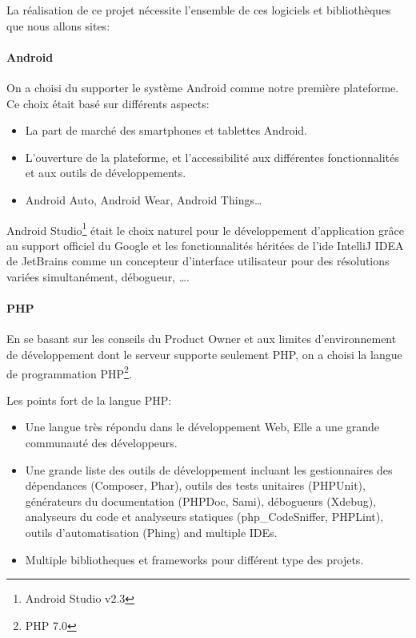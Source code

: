 La réalisation de ce projet nécessite l'ensemble de ces logiciels et
bibliothèques que nous allons sites:

\paragraph{Android}

On a choisi du supporter le système Android comme notre première plateforme. Ce
choix était basé sur différents aspects:

\begin{itemize}
    \item La part de marché des smartphones et tablettes Android.
    \item L'ouverture de la plateforme, et l'accessibilité aux différentes
        fonctionnalités et aux outils de développements.
    \item Android Auto, Android Wear, Android Things\ldots
\end{itemize}

Android Studio\footnote{Android Studio v2.3} était le choix naturel pour le
développement d'application grâce au support officiel du Google et les
fonctionnalités héritées de l'ide IntelliJ IDEA de JetBrains comme un
concepteur d’interface utilisateur pour des résolutions variées simultanément,
débogueur, \ldots.


\paragraph{PHP}
En se basant sur les conseils du Product Owner et aux limites d'environnement
de développement dont le serveur supporte seulement PHP, on a choisi la langue
de programmation PHP\footnote{PHP 7.0}.

Les points fort de la langue PHP:

\begin{itemize}
    \item Une langue très répondu dans le développement Web, Elle a une
        grande communauté des développeurs.
    \item Une grande liste des outils de développement incluant les
        gestionnaires des dépendances (Composer, Phar), outils des tests
        unitaires (PHPUnit), générateurs du documentation (PHPDoc, Sami),
        débogueurs (Xdebug), analyseurs du code et analyseurs statiques
        (php\_CodeSniffer, PHPLint), outils d'automatisation (Phing) and
        multiple IDEs.
    \item Multiple bibliotheques et frameworks pour différent type des projets.
\end{itemize}


